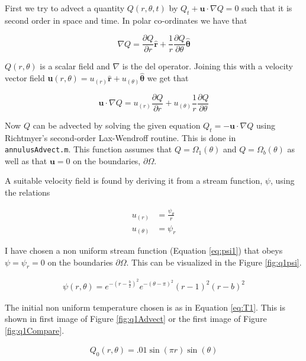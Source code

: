 \documentclass{article}
\begin{document}
First we try to advect a quantity $Q(r,\theta, t)$ by $Q_t + \textbf{u} \cdot \nabla Q = 0$ such that it is second order in space and time. In polar co-ordinates we have that

\begin{equation}
	\nabla Q = \frac{\partial Q}{\partial r} \boldsymbol{\hat{r}} + \frac{1}{r} \frac{\partial Q}{\partial \theta} \boldsymbol{\hat{\theta}}
\end{equation}

$Q(r, \theta)$ is a scalar field and $\nabla$ is the del operator. Joining this with a velocity vector field \textbf{u}$(r, \theta) = u_{(r)} \boldsymbol{\hat{r}} + u_{(\theta)} \boldsymbol{\hat{\theta}}$ we get that

\begin{equation}
	\textbf{u} \cdot \nabla Q = u_{(r)} \frac{\partial Q}{\partial r} + u_{(\theta)} \frac{1}{r} \frac{\partial Q}{\partial \theta}
\end{equation}

Now $Q$ can be advected by solving the given equation $Q_t = - \textbf{u} \cdot \nabla Q$ using Richtmyer's second-order Lax-Wendroff routine. This is done in \texttt{annulusAdvect.m}. This function assumes that $Q = \Omega_1(\theta)$ and $Q = \Omega_b(\theta)$ as well as that $\textbf{u} = 0$ on the boundaries, $\partial \Omega$.

A suitable velocity field is found by deriving it from a stream function, $\psi$, using the relations 

\begin{align*}
	u_{(r)} &= \frac{\psi_\theta}{r} \\
	u_{(\theta)} &= \psi_r
\end{align*}

I have chosen a non uniform stream function (Equation \ref{eq:psi1}) that obeys $\psi = \psi_r = 0$ on the boundaries $\partial \Omega$. This can be visualized in the Figure \ref{fig:q1psi}.

\begin{align}
	\psi(r, \theta) = e^{- \left(r - \frac{b}{2}\right)^2} e^{ - (\theta - \pi)^2 } (r-1)^2 (r-b)^2
	\label{eq:psi1}
\end{align}

The initial non uniform temperature chosen is as in Equation \ref{eq:T1}. This is shown in first image of Figure \ref{fig:q1Advect} or the first image of Figure \ref{fig:q1Compare}.

\begin{align}
	Q_0(r, \theta) = .01 \sin(\pi r) \sin(\theta)
	\label{eq:T1}
\end{align}
\end{document}
